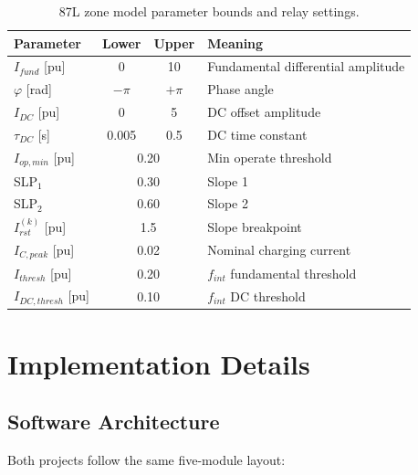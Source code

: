 \documentclass[12pt,a4paper]{article}
\newcommand{\Irst}{I_{rst}}
\newcommand{\Idc}{I_{DC}}
\begin{document}
\begin{table}[h!]
\centering
\caption{87L zone model parameter bounds and relay settings.}
\label{tab:87L_bounds}
\begin{tabular}{lccl}
\toprule
Parameter & Lower & Upper & Meaning\\
\midrule
$I_{fund}$ [pu]    & 0     & 10    & Fundamental differential amplitude\\
$\varphi$ [rad]    & $-\pi$& $+\pi$& Phase angle\\
$\Idc$ [pu]        & 0     & 5     & DC offset amplitude\\
$\tau_{DC}$ [s]    & 0.005 & 0.5   & DC time constant\\
\midrule
$I_{op,min}$ [pu]  & \multicolumn{2}{c}{0.20} & Min operate threshold\\
SLP$_1$            & \multicolumn{2}{c}{0.30} & Slope 1\\
SLP$_2$            & \multicolumn{2}{c}{0.60} & Slope 2\\
$\Irst^{(k)}$ [pu] & \multicolumn{2}{c}{1.5}  & Slope breakpoint\\
$I_{C,peak}$ [pu]  & \multicolumn{2}{c}{0.02} & Nominal charging current\\
$I_{thresh}$ [pu]  & \multicolumn{2}{c}{0.20} & $f_{int}$ fundamental threshold\\
$I_{DC,thresh}$ [pu]& \multicolumn{2}{c}{0.10}& $f_{int}$ DC threshold\\
\bottomrule
\end{tabular}
\end{table}

\section{Implementation Details}
\label{sec:implementation}

\subsection{Software Architecture}

Both projects follow the same five-module layout:
\end{document}
